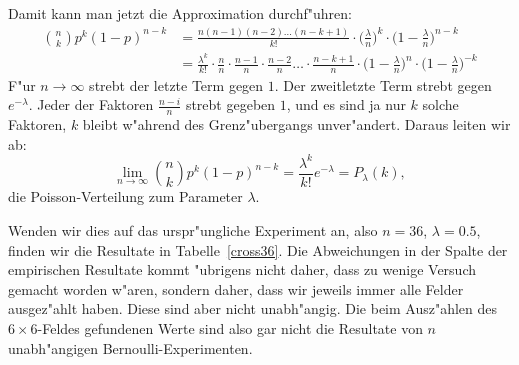 Damit kann man jetzt die Approximation durchf"uhren:
\begin{align*}
\binom{n}{k}p^k(1-p)^{n-k}
&=
\frac{n(n-1)(n-2)\dots(n-k+1)}{k!}\cdot \biggl(\frac{\lambda}n\biggr)^k\cdot \biggl(1-\frac{\lambda}n\biggr)^{n-k}\\
&=
\frac{\lambda^k}{k!}
\cdot\frac{n}{n}
\cdot\frac{n-1}{n}
\cdot\frac{n-2}{n}
\dots
\cdot\frac{n-k+1}{n}
\cdot
\biggl(1-\frac{\lambda}n\biggr)^n
\cdot
\biggl(1-\frac{\lambda}n\biggr)^{-k}
\end{align*}
F"ur $n\to\infty$ strebt der letzte Term gegen $1$.
Der zweitletzte Term strebt gegen $e^{-\lambda}$.
Jeder der Faktoren $\frac{n-i}n$ strebt gegeben $1$, und es sind ja nur
$k$ solche Faktoren, $k$ bleibt w"ahrend des Grenz"ubergangs unver"andert.
Daraus leiten wir ab:
\[
\lim_{n\to\infty} 
\binom{n}{k}p^k(1-p)^{n-k}
=
\frac{\lambda^k}{k!}e^{-\lambda}=P_{\lambda}(k),
\]
die Poisson-Verteilung zum Parameter $\lambda$.

Wenden wir dies auf das urspr"ungliche Experiment an, also $n=36$,
$\lambda=0.5$, finden wir die Resultate in Tabelle~\ref{cross36}. 
Die Abweichungen in der Spalte der empirischen Resultate kommt "ubrigens
nicht daher, dass zu wenige Versuch gemacht worden w"aren, sondern daher,
dass wir jeweils immer alle Felder ausgez"ahlt haben. Diese sind aber nicht
unabh"angig. Die beim Ausz"ahlen des $6\times 6$-Feldes gefundenen Werte
sind also gar nicht die Resultate von $n$ unabh"angigen Bernoulli-Experimenten.
